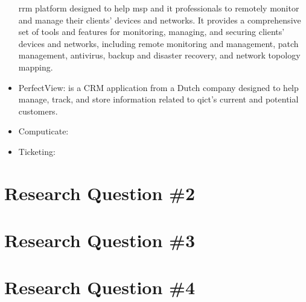 \begin{multicols}{2}
\begin{itemize}
                  \acrshort{rrm} platform designed to help \acrshort{msp} and \acrshort{it} professionals to
                  remotely monitor and manage their clients' devices and networks. It provides a comprehensive
                  set of tools and features for monitoring, managing, and securing clients' devices and networks,
                  including remote monitoring and management, patch management, antivirus, backup and disaster
                  recovery, and network topology mapping.
            \item PerfectView: is a \gls{CRM} application from a Dutch company designed to help manage, track, and
                  store information related to \acrshort{qict}'s current and potential customers.
            \item Computicate:
            \item Ticketing:
      \end{itemize}
      \section{Research Question \#2}
      \section{Research Question \#3}
      \section{Research Question \#4}
\end{multicols}